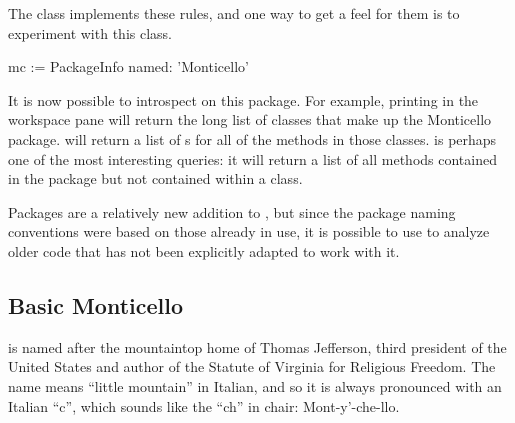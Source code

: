 \documentclass[a4paper,10pt,twoside]{book}
\begin{document}
The class  implements these rules, and one way to get a feel for them is to experiment with this class.


\begin{code}{}
mc := PackageInfo named: 'Monticello'
\end{code}

It is now possible to introspect on this package. 
For example, printing  in the workspace pane will return the long list of classes that make up the Monticello package.  
will return a list of s for all of the methods in those classes.  is perhaps one of the most interesting queries: it will return a list of all methods contained in the  package but not contained within a  class.

Packages are a relatively new addition to \pharo, but since the package naming conventions were based on those already in use, it is possible to use  to analyze older code that has not been explicitly adapted to work with it.


\subsection{Basic Monticello}

 is named after the mountaintop home of Thomas Jefferson, third president of the United States and author of the Statute of Virginia for Religious Freedom.  The name means ``little mountain'' in Italian, and so it is always pronounced with an Italian ``c'', which sounds like the ``ch'' in chair: Mont-y'-che-llo.
\end{document}
